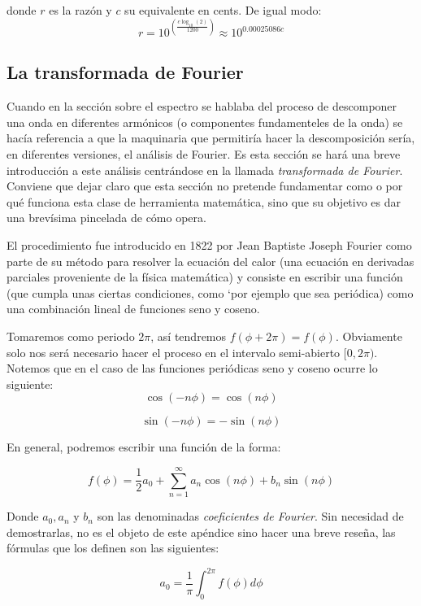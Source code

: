 \documentclass[11pt,a4paper]{article}
\begin{document}
donde $r$ es la razón y $c$ su equivalente en cents. De igual modo:
$$\boxed{ r = 10^{ \left(    \frac{c \log_{10} (2)}{1200}    	\right)} \approx 10^{0.00025086 c} } $$

\subsection{La transformada de Fourier}

Cuando en la sección sobre el espectro se hablaba del proceso de descomponer una onda en diferentes armónicos (o componentes fundamenteles de la onda) se hacía referencia a que la maquinaria que permitiría hacer la descomposición sería, en diferentes versiones, el análisis de Fourier. Es esta sección se hará una breve introducción a este análisis centrándose en la llamada \emph{transformada de Fourier}. Conviene que dejar claro que esta sección no pretende fundamentar como o por qué funciona esta clase de herramienta matemática, sino que su objetivo es dar una brevísima pincelada de cómo opera.

El procedimiento fue introducido en 1822 por Jean Baptiste Joseph Fourier como parte de su método para resolver la ecuación del calor (una ecuación en derivadas parciales proveniente de la física matemática) y consiste en escribir una función (que cumpla unas ciertas condiciones, como `por ejemplo que sea periódica) como una combinación lineal de funciones seno y coseno.

Tomaremos como periodo $2 \pi$, así tendremos $ f(\phi + 2\pi) = f(\phi)$. Obviamente solo nos será necesario hacer el proceso en el intervalo semi-abierto $[0, 2\pi)$. Notemos que en el caso de las funciones periódicas seno y coseno ocurre lo siguiente:
$$
	\cos(-n \phi) = \cos(n \phi)  
$$	 
	 
$$	
	\sin(-n \phi) = - \sin(n \phi)	
$$ 
 
En general, podremos escribir una función de la forma:

\begin{equation*}
    \boxed{
        f(\phi) = \frac{1}{2}a_{0} + \sum_{n=1}^{\infty} {a_n \cos(n\phi) + b_n \sin(n\phi)}
    }
\end{equation*}

Donde $a_0,a_n$ y $b_n$ son las denominadas \emph{coeficientes de Fourier}. Sin necesidad de demostrarlas, no es el objeto de este apéndice sino hacer una breve reseña, las fórmulas que los definen son las siguientes:

$$
	a_0 = \frac{1}{\pi} \int_{0}^{2\pi} { f(\phi) } d \phi
$$
 
\end{document}
